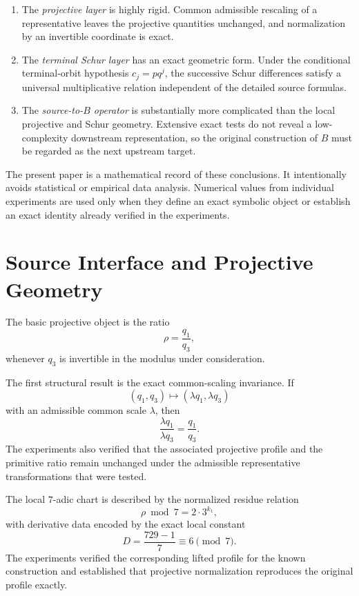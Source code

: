 \documentclass[11pt]{article}
\begin{document}
\begin{enumerate}[leftmargin=2em]
    \item The \emph{projective layer} is highly rigid. Common admissible rescaling of a representative leaves the projective quantities unchanged, and normalization by an invertible coordinate is exact.
    \item The \emph{terminal Schur layer} has an exact geometric form. Under the conditional terminal-orbit hypothesis $c_j=pq^j$, the successive Schur differences satisfy a universal multiplicative relation independent of the detailed source formulas.
    \item The \emph{source-to-$B$ operator} is substantially more complicated than the local projective and Schur geometry. Extensive exact tests do not reveal a low-complexity downstream representation, so the original construction of $B$ must be regarded as the next upstream target.
\end{enumerate}

The present paper is a mathematical record of these conclusions. It intentionally avoids statistical or empirical data analysis. Numerical values from individual experiments are used only when they define an exact symbolic object or establish an exact identity already verified in the experiments.

\section{Source Interface and Projective Geometry}

The basic projective object is the ratio
\begin{equation}
    \rho = \frac{q_1}{q_3},
\end{equation}
whenever $q_3$ is invertible in the modulus under consideration.

The first structural result is the exact common-scaling invariance. If
\begin{equation}
    (q_1,q_3) \longmapsto (\lambda q_1,\lambda q_3)
\end{equation}
with an admissible common scale $\lambda$, then
\begin{equation}
    \frac{\lambda q_1}{\lambda q_3}=\frac{q_1}{q_3}.
\end{equation}
The experiments also verified that the associated projective profile and the primitive ratio remain unchanged under the admissible representative transformations that were tested.

The local $7$-adic chart is described by the normalized residue relation
\begin{equation}
    \rho \bmod 7 = 2\cdot 3^{k_1},
\end{equation}
with derivative data encoded by the exact local constant
\begin{equation}
    D=\frac{729-1}{7}\equiv 6 \pmod 7.
\end{equation}
The experiments verified the corresponding lifted profile for the known construction and established that projective normalization reproduces the original profile exactly.
\end{document}
